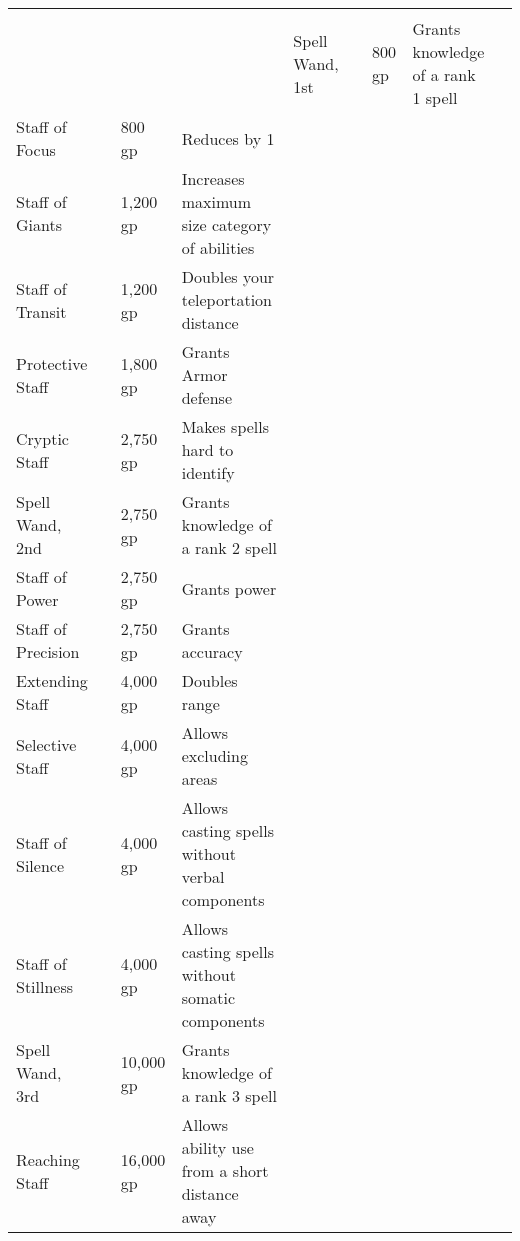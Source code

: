 
\begin{longtablewrapper}
\begin{longtable}{p{15em} p{3em} p{6em} p{25em} p{3em}}

 \\
 &  &  &  &  \tableheaderrule
Spell Wand, 1st &  & 800 gp & Grants knowledge of a rank 1 spell & \pageref{item:Spell Wand, 1st} \\
Staff of Focus &  & 800 gp & Reduces  by 1 & \pageref{item:Staff of Focus} \\
Staff of Giants &  & 1,200 gp & Increases maximum size category of abilities & \pageref{item:Staff of Giants} \\
Staff of Transit &  & 1,200 gp & Doubles your teleportation distance & \pageref{item:Staff of Transit} \\
Protective Staff &  & 1,800 gp & Grants  Armor defense & \pageref{item:Protective Staff} \\
Cryptic Staff &  & 2,750 gp & Makes spells hard to identify & \pageref{item:Cryptic Staff} \\
Spell Wand, 2nd &  & 2,750 gp & Grants knowledge of a rank 2 spell & \pageref{item:Spell Wand, 2nd} \\
Staff of Power &  & 2,750 gp & Grants   power & \pageref{item:Staff of Power} \\
Staff of Precision &  & 2,750 gp & Grants  accuracy & \pageref{item:Staff of Precision} \\
Extending Staff &  & 4,000 gp & Doubles range & \pageref{item:Extending Staff} \\
Selective Staff &  & 4,000 gp & Allows excluding areas & \pageref{item:Selective Staff} \\
Staff of Silence &  & 4,000 gp & Allows casting spells without verbal components & \pageref{item:Staff of Silence} \\
Staff of Stillness &  & 4,000 gp & Allows casting spells without somatic components & \pageref{item:Staff of Stillness} \\
Spell Wand, 3rd &  & 10,000 gp & Grants knowledge of a rank 3 spell & \pageref{item:Spell Wand, 3rd} \\
Reaching Staff &  & 16,000 gp & Allows ability use from a short distance away & \pageref{item:Reaching Staff} \\

\end{longtable}
\end{longtablewrapper}
